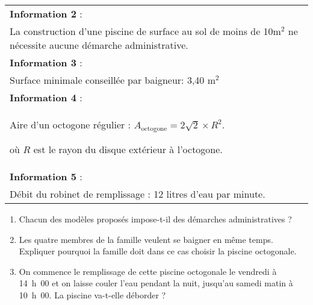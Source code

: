 \begin{tabular}{|m{11.68cm}|}
\textbf{Information 2} :\\
 La construction d'une piscine de surface au sol de moins de 10m$^2$ ne nécessite aucune démarche administrative.\\ \hline
\textbf{Information 3} :\\
Surface minimale conseillée par baigneur: 3,40 m$^2$\\ \hline
\textbf{Information 4} :\\
 Aire d'un octogone régulier : $A_{\text{octogone}} = 2\sqrt{2} \times  R^2$. 

où $R$ est le rayon du disque extérieur à l'octogone.\\ \hline
\textbf{Information 5} :\\
Débit du robinet de remplissage : 12 litres d'eau par minute.\\ \hline
\end{tabular}

\medskip
 
\begin{enumerate}
\item Chacun des modèles proposés impose-t-il des démarches administratives ? 
\item Les quatre membres de la famille veulent se baigner en même temps. Expliquer pourquoi la famille doit dans ce cas choisir la piscine octogonale. 
\item On commence le remplissage de cette piscine octogonale le vendredi à 14~h~00 et on laisse couler l'eau pendant la nuit, jusqu'au samedi matin à 10~h~00. La piscine va-t-elle déborder ? 
\end{enumerate} 

\bigskip

